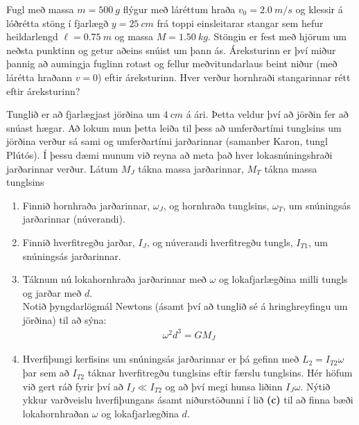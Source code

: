 \ifdefined \wholebook \else\documentclass[oneside]{book}\usepackage{EdlBook}\graphicspath{{figures/}}
\begin{document}
\begin{enumerate}[label = \textbf{Dæmi \thechapter.\arabic*.}]
\begin{minipage}{\linewidth}
\item Fugl með massa $m = \SI{500}{g}$ flýgur með láréttum hraða $v_0 = \SI{2.0}{m/s}$ og klessir á lóðrétta stöng í fjarlægð $y = \SI{25}{cm}$ frá toppi einsleitarar stangar sem hefur heildarlengd $\ell = \SI{0.75}{m}$ og massa $M = \SI{1.50}{kg}$. Stöngin er fest með hjörum um neðsta punktinn og getur aðeins snúist um þann ás. Áreksturinn er því miður þannig að aumingja fuglinn rotast og fellur meðvitundarlaus beint niður (með lárétta hraðann $v = 0$) eftir áreksturinn. Hver verður hornhraði stangarinnar rétt eftir áreksturinn? 

\end{minipage}

\vspace{0.5cm}

\item Tunglið er að fjarlægjast jörðina um $\SI{4}{cm}$ á ári. Þetta veldur því að jörðin fer að snúast hægar. Að lokum mun þetta leiða til þess að umferðartími tunglsins um jörðina verður sá sami og umferðartími jarðarinnar (samanber Karon, tungl Plútós). Í þessu dæmi munum við reyna að meta það hver lokasnúningshraði jarðarinnar verður. Látum $M_J$ tákna massa jarðarinnar, $M_T$ tákna massa tunglsins

\begin{enumerate}[label = \textbf{(\alph*)}]
    \item Finnið hornhraða jarðarinnar, $\omega_J$, og hornhraða tunglsins, $\omega_T$, um snúningsás jarðarinnar (núverandi).
    
    \item Finnið hverfitregðu jarðar, $I_J$, og núverandi hverfitregðu tungls, $I_{T1}$, um snúningsás jarðarinnar.
    
    \item Táknum nú lokahornhraða jarðarinnar með $\omega$ og lokafjarlægðina milli tungls og jarðar með $d$. \\ Notið þyngdarlögmál Newtons (ásamt því að tunglið sé á hringhreyfingu um jörðina) til að sýna:
    \begin{align*}
        \omega^2 d^3= GM_J
    \end{align*}
    
    \item Hverfiþungi kerfisins um snúningsás jarðarinnar er þá gefinn með $L_2 = I_{T2} \omega$ þar sem að $I_{T2}$ táknar hverfitregðu tunglsins eftir færslu tunglsins. Hér höfum við gert ráð fyrir því að $I_J \ll I_{T2}$ og að því megi hunsa liðinn $I_J\omega$. Nýtið ykkur varðveislu hverfiþungans ásamt niðurstöðunni í lið \textbf{(c)} til að finna bæði lokahornhraðan $\omega$ og lokafjarlægðina $d$.
    

\end{enumerate}
\end{enumerate}
\end{document}
